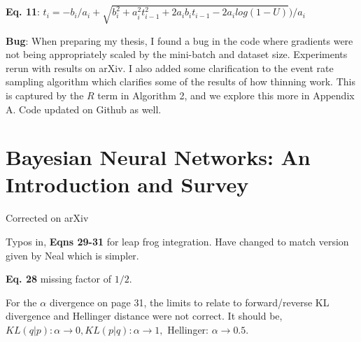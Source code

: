 \documentclass{article}
\begin{document}
\textbf{Eq. 11}: $t_{i} =  -b_{i} / a_{i} + \sqrt{b_{i}^{2} +  a_{i}^{2}t_{i-1}^{2} + 2a_{i}b_{i}t_{i-1} - 2a_{i}log(1 - U)}\big ) /a_{i}$

\textbf{Bug}: When preparing my thesis, I found a bug in the code where gradients were not being appropriately scaled by the mini-batch and dataset size. Experiments rerun with results on arXiv. I also added some clarification to the event rate sampling algorithm which clarifies some of the results of how thinning work. This is captured by the $R$ term in Algorithm 2, and we explore this more in Appendix A. Code updated on Github as well.

\section{Bayesian Neural Networks: An Introduction and Survey}
Corrected on arXiv

Typos in, \textbf{Eqns 29-31} for leap frog integration. Have changed to match version given by Neal which is simpler.

\textbf{Eq. 28} missing factor of $1/2$.

For the $\alpha$ divergence on page 31, the limits to relate to forward/reverse KL divergence and Hellinger distance were not correct. It should be, $KL(q|p): \alpha \rightarrow 0, KL(p|q): \alpha \rightarrow 1,$ Hellinger: $ \alpha \rightarrow 0.5$.
\end{document}
